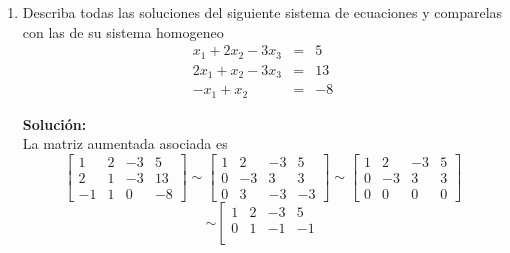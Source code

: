 \documentclass[12pt]{article}
\newenvironment{solucion}
{\begin{mdframed}[backgroundcolor=black!10]
		{\bf Solución:}\\
	}
	{
	\end{mdframed}
}
\newenvironment{preguntas}
{\begin{enumerate}\itemsep12pt
	}
	{
	\end{enumerate}
}
\newcommand{\widesim}[2][1.5]{
	\mathrel{\overset{#2}{\scalebox{#1}[1]{$\sim$}}}
}
\newcommand{\wsim}{\widesim{}}
\begin{document}
\begin{preguntas}
$$\begin{array}{rcr}
	-2x -y +5z & = & 6
	\end{array}$$
\begin{solucion}
Busquemos la forma escalonada de la matriz aumentada correspondiente al sistema
		$$
		\left[
		\begin{array}{ccc|c}
		1 & 1 & -1 & 1\\
		3 & 2 & 1 & 1\\
		5 & 3 & 4 & 2\\
		-2 & -1 & 5 & 6
		\end{array}
		\right] \wsim 
		\left[
		\begin{array}{ccc|c}
		1 & 1 & -1 & 1\\
		0 & -1 & 4 & 2\\
		0 & 0 & 1 & 1\\
		0 & 0 & 0 & -1
		\end{array}
		\right]$$
		Podemos ver que la última linea equivale a $0 = -1$, por lo que el sistema es inconsistente, es decir, no tiene solución.
\end{solucion}
\item Describa todas las soluciones del siguiente sistema de ecuaciones y comparelas con las de su sistema homogeneo
	$$
	\begin{array}{rcr}
	x_1 +2x_2-3x_3& = & 5\\
	2x_1 + x_2 - 3x_3& = & 13\\
	-x_1 + x_2 & = & -8
	\end{array}$$
\begin{solucion}
La matriz aumentada asociada es
		$$\left[
		\begin{array}{ccc|c}
		1 & 2 & -3 & 5\\
		2 & 1 & -3 & 13\\
		-1 & 1 & 0 & -8
		\end{array}
		\right] \sim \left[
		\begin{array}{ccc|c}
		1 & 2 & -3 & 5\\
		0 & -3 & 3 & 3\\
		0 & 3 & -3 & -3
		\end{array}
		\right] \sim \left[
		\begin{array}{ccc|c}
		1 & 2 & -3 & 5\\
		0 & -3 & 3 & 3\\
		0 & 0 & 0 & 0
		\end{array}
		\right]$$
		$$ \sim \left[
		\begin{array}{ccc|c}
		1 & 2 & -3 & 5\\
		0 & 1 & -1 & -1\\

\end{array}$$
\end{solucion}
\end{preguntas}
\end{document}
